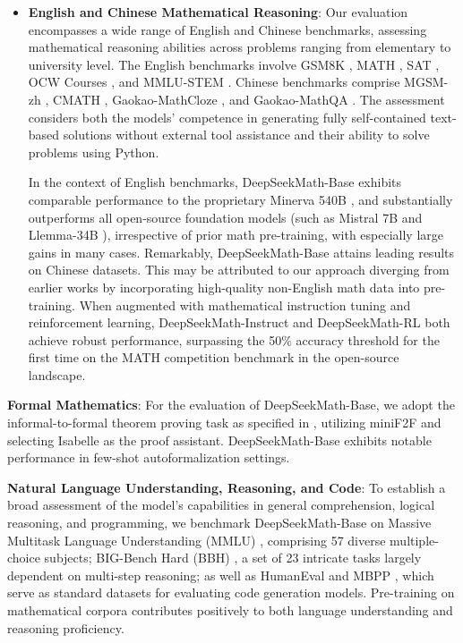 \begin{itemize}[topsep=0pt]
    \item \textbf{English and Chinese Mathematical Reasoning}: Our evaluation encompasses a wide range of English and Chinese benchmarks, assessing mathematical reasoning abilities across problems ranging from elementary to university level. The English benchmarks involve GSM8K \citep{gsm8k}, MATH \citep{MATH}, SAT \citep{llemma}, OCW Courses \citep{minerva}, and MMLU-STEM \citep{mmlu}. Chinese benchmarks comprise MGSM-zh \citep{mgsm}, CMATH \citep{wei2023cmath}, Gaokao-MathCloze \citep{agieval}, and Gaokao-MathQA \citep{agieval}. The assessment considers both the models’ competence in generating fully self-contained text-based solutions without external tool assistance and their ability to solve problems using Python.

    In the context of English benchmarks, DeepSeekMath-Base exhibits comparable performance to the proprietary Minerva 540B \citep{minerva}, and substantially outperforms all open-source foundation models (such as Mistral 7B \citep{mistral} and Llemma-34B \citep{llemma}), irrespective of prior math pre-training, with especially large gains in many cases. Remarkably, DeepSeekMath-Base attains leading results on Chinese datasets. This may be attributed to our approach diverging from earlier works \citep{minerva,llemma} by incorporating high-quality non-English math data into pre-training. When augmented with mathematical instruction tuning and reinforcement learning, DeepSeekMath-Instruct and DeepSeekMath-RL both achieve robust performance, surpassing the 50\% accuracy threshold for the first time on the MATH competition benchmark in the open-source landscape.
\end{itemize}

\item \textbf{Formal Mathematics}: For the evaluation of DeepSeekMath-Base, we adopt the informal-to-formal theorem proving task as specified in \citep{dsp_proof}, utilizing miniF2F \citep{minif2f} and selecting Isabelle \citep{isabelle} as the proof assistant. DeepSeekMath-Base exhibits notable performance in few-shot autoformalization settings.
\item \textbf{Natural Language Understanding, Reasoning, and Code}: To establish a broad assessment of the model’s capabilities in general comprehension, logical reasoning, and programming, we benchmark DeepSeekMath-Base on Massive Multitask Language Understanding (MMLU) \citep{mmlu}, comprising 57 diverse multiple-choice subjects; BIG-Bench Hard (BBH) \citep{bbh}, a set of 23 intricate tasks largely dependent on multi-step reasoning; as well as HumanEval \citep{codex} and MBPP \citep{mbpp}, which serve as standard datasets for evaluating code generation models. Pre-training on mathematical corpora contributes positively to both language understanding and reasoning proficiency.

